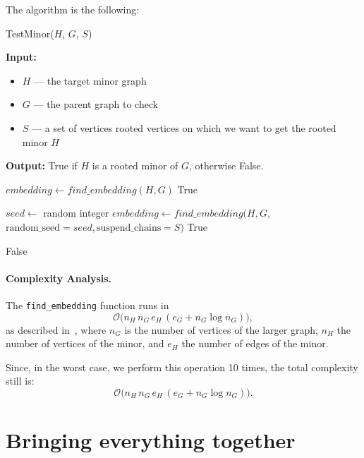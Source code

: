 The algorithm is the following:

\begin{algorithm}[H]
    \caption{TestMinor($H$, $G$, $S$)}
    \begin{algorithmic}[1]
        \Statex \textbf{Input:} 
        \begin{itemize}
            \item \( H \) — the target minor graph
            \item \( G \) — the parent graph to check
            \item \( S \) — a set of vertices rooted vertices on which we want to get the rooted minor $H$ 
        \end{itemize}
        \Statex \textbf{Output:} True if $H$ is a rooted minor of $G$, otherwise False.

        \State $embedding \gets {find\_embedding}(H, G)$
            \State \Return True
        \EndIf

            \State $seed \gets$ random integer
            \State $embedding \gets find\_embedding(H, G,$
            \Statex \hspace{\algorithmicindent}$\text{random\_seed} = seed, \text{suspend\_chains} = S)$
                \State \Return True
            \EndIf
        \EndFor

        \State \Return False
    \end{algorithmic}
\end{algorithm}

\paragraph{Complexity Analysis.}

The \texttt{find\_embedding} function runs in
\[
  \mathcal{O}\bigl(n_H\,n_G\,e_H\,(e_G + n_G \log n_G)\bigr),
\]
as described in~\cite{cai2014practicalheuristicfindinggraph}, where $n_G$ is the number of vertices of the larger graph, $n_H$ the number of vertices of the minor, and $e_H$ the number of edges of the minor.

Since, in the worst case, we perform this operation 10 times, the total complexity still is:
\[
  \mathcal{O}\bigl(n_H\,n_G\,e_H\,(e_G + n_G \log n_G)\bigr).
\]

\section{Bringing everything together}
\label{main:algo:section}

